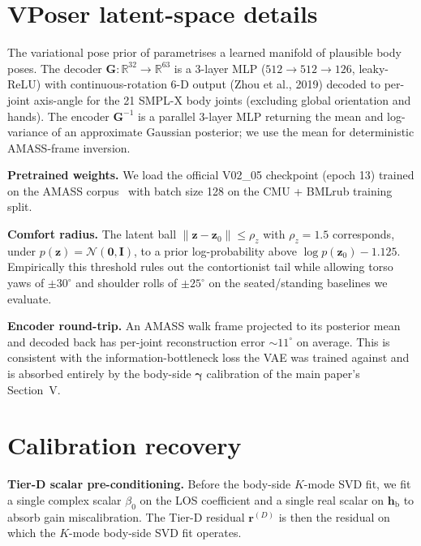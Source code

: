 \documentclass[10pt,journal,twocolumn]{IEEEtran}
\newcommand{\gammab}{\bm{\gamma}}
\newcommand{\hbody}{\bm{h}_{\mathrm{b}}}
\newcommand{\Reals}{\mathbb{R}}
\theoremstyle{plain}
\theoremstyle{definition}
\begin{document}
\section{VPoser latent-space details}\label{si:vposer}

The variational pose prior of \cite{Pavlakos2019VPoser} parametrises
a learned manifold of plausible body poses. The decoder
$\bm{G}: \Reals^{32} \to \Reals^{63}$ is a 3-layer MLP
($512 \to 512 \to 126$, leaky-ReLU) with continuous-rotation 6-D
output (Zhou et al., 2019) decoded to per-joint axis-angle for the
21 SMPL-X body joints (excluding global orientation and hands).
The encoder $\bm{G}^{-1}$ is a parallel 3-layer MLP returning the
mean and log-variance of an approximate Gaussian posterior; we use
the mean for deterministic AMASS-frame inversion.

\textbf{Pretrained weights.} We load the official V02\_05 checkpoint
(epoch 13) trained on the AMASS corpus~\cite{AMASS2019} with batch
size 128 on the CMU + BMLrub training split.

\textbf{Comfort radius.} The latent ball
$\|\bm{z} - \bm{z}_0\| \leq \rho_z$ with $\rho_z = 1.5$ corresponds,
under $p(\bm{z}) = \mathcal{N}(\bm{0}, \bm{I})$, to a prior
log-probability above $\log p(\bm{z}_0) - 1.125$. Empirically this
threshold rules out the contortionist tail while allowing torso
yaws of $\pm 30^{\circ}$ and shoulder rolls of $\pm 25^{\circ}$ on
the seated/standing baselines we evaluate.

\textbf{Encoder round-trip.} An AMASS walk frame projected to its
posterior mean and decoded back has per-joint reconstruction error
$\sim 11^{\circ}$ on average. This is consistent with the
information-bottleneck loss the VAE was trained against and is
absorbed entirely by the body-side $\gammab$ calibration of the
main paper's Section~V.

\section{Calibration recovery}\label{si:calibration}

\textbf{Tier-D scalar pre-conditioning.} Before the body-side
$K$-mode SVD fit, we fit a single complex scalar $\beta_0$ on the
LOS coefficient and a single real scalar on $\hbody$ to absorb
gain miscalibration. The Tier-D residual $\bm{r}^{(D)}$ is then
the residual on which the $K$-mode body-side SVD fit operates.
\end{document}
